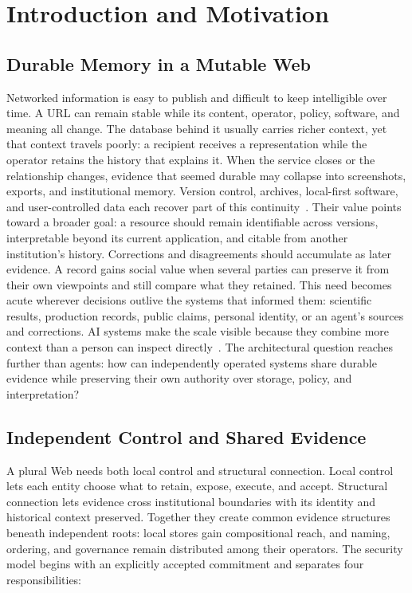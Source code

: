 \section{Introduction and Motivation}
\label{sec:introduction}
\label{sec:requirements}

\subsection{Durable Memory in a Mutable Web}

Networked information is easy to publish and difficult to keep intelligible over time. A URL can remain stable while its content, operator, policy, software, and meaning all change. The database behind it usually carries richer context, yet that context travels poorly: a recipient receives a representation while the operator retains the history that explains it. When the service closes or the relationship changes, evidence that seemed durable may collapse into screenshots, exports, and institutional memory. Version control, archives, local-first software, and user-controlled data each recover part of this continuity~\cite{Kleppmann2019local,Mansour2016solid}. Their value points toward a broader goal: a resource should remain identifiable across versions, interpretable beyond its current application, and citable from another institution's history. Corrections and disagreements should accumulate as later evidence. A record gains social value when several parties can preserve it from their own viewpoints and still compare what they retained. This need becomes acute wherever decisions outlive the systems that informed them: scientific results, production records, public claims, personal identity, or an agent's sources and corrections. AI systems make the scale visible because they combine more context than a person can inspect directly~\cite{Lewis2020retrieval,Park2023generative,Anokhin2025arigraph,Gu2024hipporag}. The architectural question reaches further than agents: how can independently operated systems share durable evidence while preserving their own authority over storage, policy, and interpretation?

\subsection{Independent Control and Shared Evidence}

A plural Web needs both local control and structural connection. Local control lets each entity choose what to retain, expose, execute, and accept. Structural connection lets evidence cross institutional boundaries with its identity and historical context preserved. Together they create common evidence structures beneath independent roots: local stores gain compositional reach, and naming, ordering, and governance remain distributed among their operators. The security model begins with an explicitly accepted commitment and separates four responsibilities:

